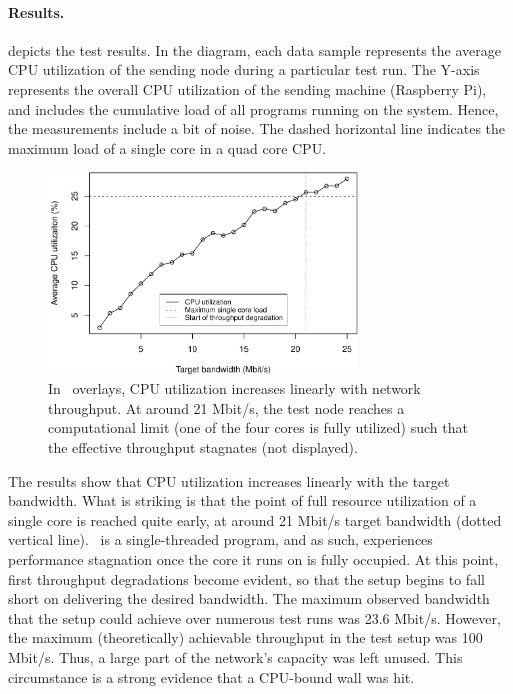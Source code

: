 \paragraph{Results.}
 depicts the test results. In the diagram, each data sample represents the average CPU utilization of the sending node during a particular test run. The Y-axis represents the overall CPU utilization of the sending machine (Raspberry Pi), and includes the cumulative load of all programs running on the system. Hence, the measurements include a bit of noise. The dashed horizontal line indicates the maximum load of a single core in a quad core CPU.
\begin{figure}[htpb]
  \centering
  \includegraphics[width=0.73\textwidth]{figures/cpu}
  \caption[\weave\ CPU utilization test results]{In \weave\ overlays, CPU utilization increases linearly with network throughput. At around 21 Mbit/s, the test node reaches a computational limit (one of the four cores is fully utilized) such that the effective throughput stagnates (not displayed).}\label{fig:cpu}
\end{figure}

The results show that CPU utilization increases linearly with the target bandwidth. What is striking is that the point of full resource utilization of a single core is reached quite early, at around 21 Mbit/s target bandwidth (dotted vertical line). \wnet\ is a single-threaded program, and as such, experiences performance stagnation once the core it runs on is fully occupied. At this point, first throughput degradations become evident, so that the setup begins to fall short on delivering the desired bandwidth. The maximum observed bandwidth that the setup could achieve over numerous test runs was 23.6 Mbit/s.
However, the maximum (theoretically) achievable throughput in the test setup was 100 Mbit/s. Thus, a large part of the network's capacity was left unused. This circumstance is a strong evidence that a CPU-bound wall was hit.
%
%
%
%
%
%
%
%
%
%
\pagebreak
